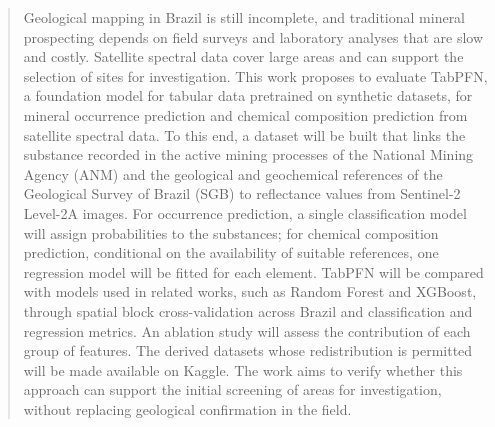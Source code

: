\begin{abstract}
Geological mapping in Brazil is still incomplete, and traditional mineral prospecting depends on field surveys and laboratory analyses that are slow and costly. Satellite spectral data cover large areas and can support the selection of sites for investigation. This work proposes to evaluate TabPFN, a foundation model for tabular data pretrained on synthetic datasets, for mineral occurrence prediction and chemical composition prediction from satellite spectral data. To this end, a dataset will be built that links the substance recorded in the active mining processes of the National Mining Agency (ANM) and the geological and geochemical references of the Geological Survey of Brazil (SGB) to reflectance values from Sentinel-2 Level-2A images. For occurrence prediction, a single classification model will assign probabilities to the substances; for chemical composition prediction, conditional on the availability of suitable references, one regression model will be fitted for each element. TabPFN will be compared with models used in related works, such as Random Forest and XGBoost, through spatial block cross-validation across Brazil and classification and regression metrics. An ablation study will assess the contribution of each group of features. The derived datasets whose redistribution is permitted will be made available on Kaggle. The work aims to verify whether this approach can support the initial screening of areas for investigation, without replacing geological confirmation in the field.
\end{abstract}
